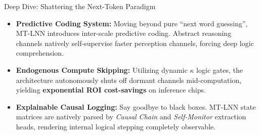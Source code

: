 ﻿\documentclass[aspectratio=169, 10pt]{beamer}
\begin{document}
\begin{frame}{Deep Dive: Shattering the Next-Token Paradigm}
\begin{itemize}
    \item \textbf{Predictive Coding System:} Moving beyond pure ``next word guessing'', MT-LNN introduces inter-scale predictive coding. Abstract reasoning channels natively self-supervise faster perception channels, forcing deep logic comprehension.
    \item \textbf{Endogenous Compute Skipping:} Utilizing dynamic $\kappa$ logic gates, the architecture autonomously shuts off dormant channels mid-computation, yielding \textbf{exponential ROI cost-savings} on inference chips.
    \item \textbf{Explainable Causal Logging:} Say goodbye to black boxes. MT-LNN state matrices are natively parsed by \textit{Causal Chain} and \textit{Self-Monitor} extraction heads, rendering internal logical stepping completely observable.
\end{itemize}
\end{frame}
\end{document}

